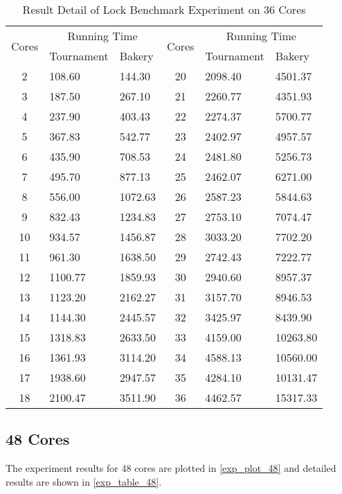 \documentclass{article}
\begin{document}
\begin{table}[H]
    \caption{Result Detail of Lock Benchmark Experiment on 36 Cores}
    \label{exp_table_36}
    \centering
    \begin{tabular}{c|ll|c|ll}
        \toprule
        \multirow{2}{*}{Cores} & \multicolumn{2}{|c|}{Running Time} &
        \multirow{2}{*}{Cores} & \multicolumn{2}{|c}{Running Time} \\
                               & Tournament & Bakery & & Tournament & Bakery \\\midrule
        2 & 108.60 & 144.30 & 20 & 2098.40 & 4501.37 \\
        3 & 187.50 & 267.10 & 21 & 2260.77 & 4351.93 \\
        4 & 237.90 & 403.43 & 22 & 2274.37 & 5700.77 \\
        5 & 367.83 & 542.77 & 23 & 2402.97 & 4957.57 \\
        6 & 435.90 & 708.53 & 24 & 2481.80 & 5256.73 \\
        7 & 495.70 & 877.13 & 25 & 2462.07 & 6271.00 \\
        8 & 556.00 & 1072.63 & 26 & 2587.23 & 5844.63 \\
        9 & 832.43 & 1234.83 & 27 & 2753.10 & 7074.47 \\
        10 & 934.57 & 1456.87 & 28 & 3033.20 & 7702.20 \\
        11 & 961.30 & 1638.50 & 29 & 2742.43 & 7222.77 \\
        12 & 1100.77 & 1859.93 & 30 & 2940.60 & 8957.37 \\
        13 & 1123.20 & 2162.27 & 31 & 3157.70 & 8946.53 \\
        14 & 1144.30 & 2445.57 & 32 & 3425.97 & 8439.90 \\
        15 & 1318.83 & 2633.50 & 33 & 4159.00 & 10263.80 \\
        16 & 1361.93 & 3114.20 & 34 & 4588.13 & 10560.00 \\
        17 & 1938.60 & 2947.57 & 35 & 4284.10 & 10131.47 \\
        18 & 2100.47 & 3511.90 & 36 & 4462.57 & 15317.33 \\
        \bottomrule
    \end{tabular}
\end{table}

\subsection*{48 Cores}
The experiment results for 48 cores are plotted in \cref{exp_plot_48} and
detailed results are shown in \cref{exp_table_48}.
\end{document}
